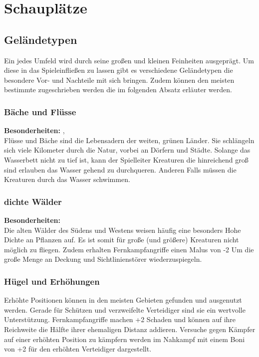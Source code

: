 \chapter{Schauplätze}

\section{Geländetypen}
Ein jedes Umfeld wird durch seine großen und kleinen Feinheiten ausgeprägt. Um diese in das Spieleinfließen zu lassen gibt es verschiedene Geländetypen die besondere Vor- und Nachteile mit sich bringen. Zudem können den meisten bestimmte \textit{} zugeschrieben werden die im folgenden Absatz erläuter werden.

\subsection*{Bäche und Flüsse}
\textbf{Besonderheiten:} \textit{},\textit{}\\
Flüsse und Bäche sind die Lebensadern der weiten, grünen Länder. Sie schlängeln sich viele Kilometer durch die Natur, vorbei an Dörfern und Städte. Solange das Wasserbett nicht zu tief ist, kann der Spielleiter Kreaturen die hinreichend groß sind erlauben das Wasser gehend zu durchqueren. Anderen Falls müssen die Kreaturen durch das Wasser schwimmen.

\subsection*{dichte Wälder}
\textbf{Besonderheiten:} \textit{}\\
Die alten Wälder des Südens und Westens weisen häufig eine besonders Hohe Dichte an Pflanzen auf. Es ist somit für große (und größere) Kreaturen nicht möglich zu fliegen. Zudem erhalten Fernkampfangriffe einen Malus von -2 Um die große Menge an Deckung und Sichtlinienstörer wiederzuspiegeln.

\subsection*{Hügel und Erhöhungen}
Erhöhte Positionen können in den meisten Gebieten gefunden und ausgenutzt werden. Gerade für Schützen und verzweifelte Verteidiger sind sie ein wertvolle Unterstützung. Fernkampfangriffe machen +2 Schaden und können auf ihre Reichweite die Hälfte ihrer ehemaligen Distanz addieren. Versuche gegen Kämpfer auf einer erhöhten Position zu kämpfern werden im Nahkampf mit einem Boni von +2 für den erhöhten Verteidiger dargestellt.

